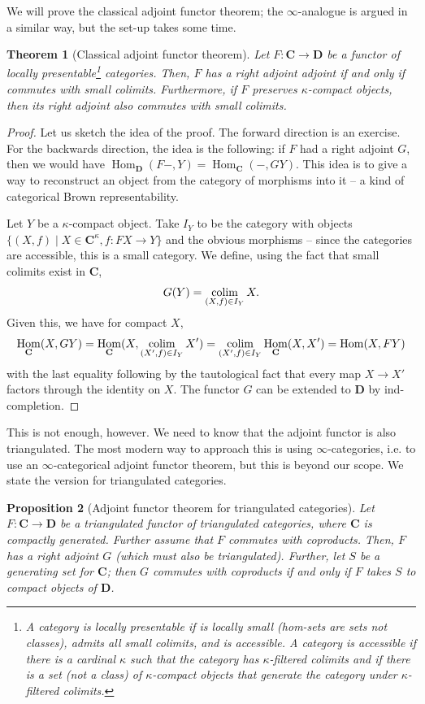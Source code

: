 \documentclass[10pt]{article}
\newtheorem{thm}{Theorem}[section]
\newtheorem{prop}[thm]{Proposition}
\theoremstyle{definition}
\DeclareMathOperator{\Hom}{Hom}
\newcommand{\colim}{\operatornamewithlimits{colim}}
\newcommand{\cat}{\mathbf}
\begin{document}
We will prove the classical adjoint functor theorem; the $\infty$-analogue is argued in a similar way, but the set-up takes some time.
\begin{thm}[Classical adjoint functor theorem]
Let $F: \cat{C} \rightarrow \cat{D}$ be a functor of locally presentable\footnote{A category is \emph{locally presentable} if is locally small (hom-sets are sets not classes), admits all small colimits, and is accessible.  A category is \emph{accessible} if there is a cardinal $\kappa$ such that the category has $\kappa$-filtered colimits and if there is a set (not a class) of $\kappa$-compact objects that generate the category under $\kappa$-filtered colimits.} categories.  Then, $F$ has a right adjoint adjoint if and only if commutes with small colimits.  Furthermore, if $F$ preserves $\kappa$-compact objects, then its right adjoint also commutes with small colimits.
\end{thm}
\begin{proof}
Let us sketch the idea of the proof.  The forward direction is an exercise.  For the backwards direction, the idea is the following: if $F$ had a right adjoint $G$, then we would have $\Hom_{\cat{D}}(F-, Y) = \Hom_{\cat{C}}(-, GY)$.  This idea is to give a way to reconstruct an object from the category of morphisms into it -- a kind of categorical Brown representability.

Let $Y$ be a $\kappa$-compact object.  Take $I_Y$ to be the category with objects $\{(X, f) \mid X \in \cat{C}^\kappa, f: FX \rightarrow Y\}$ and the obvious morphisms -- since the categories are accessible, this is a small category.  We define, using the fact that small colimits exist in $\cat{C}$,
$$G(Y) = \colim_{(X, f) \in I_Y} X.$$
Given this, we have for compact $X$,
$$\Hom_{\cat{C}}(X, GY) = \Hom_{\cat{C}}(X, \colim_{(X', f) \in I_Y} X') = \colim_{(X', f) \in I_Y} \Hom_{\cat{C}}(X, X') = \Hom(X, FY)$$
with the last equality following by the tautological fact that every map $X \rightarrow X'$ factors through the identity on $X$.  The functor $G$ can be extended to $\cat{D}$ by ind-completion.
\end{proof}

This is not enough, however.  We need to know that the adjoint functor is also triangulated.  The most modern way to approach this is using $\infty$-categories, i.e. to use an $\infty$-categorical adjoint functor theorem, but this is beyond our scope.  We state the version for triangulated categories.
\begin{prop}[Adjoint functor theorem for triangulated categories]
Let $F: \cat{C} \rightarrow \cat{D}$ be a triangulated functor of triangulated categories, where $\cat{C}$ is compactly generated.  Further assume that $F$ commutes with coproducts.  Then, $F$ has a right adjoint $G$ (which must also be triangulated).  Further, let $S$ be a generating set for $\cat{C}$; then $G$ commutes with coproducts if and only if $F$ takes $S$ to compact objects of $\cat{D}$.
\end{prop}
\end{document}
